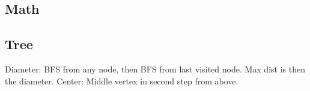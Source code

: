 \documentclass[10pt,a4paper,ngerman,oneside,]{article}
\begin{document}
\begin{multicols}{2}




\section{Math}
\subsection{Tree}
Diameter: BFS from any node, then BFS from last visited node.
Max dist is then the diameter.
Center: Middle vertex in second step from above.

\end{multicols}
\end{document}
